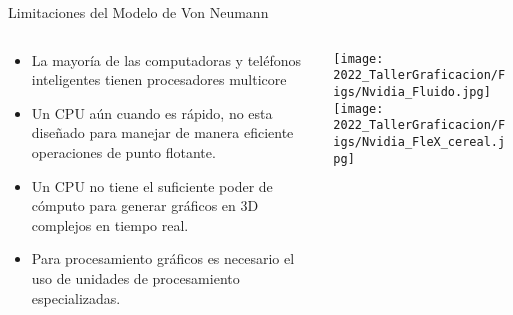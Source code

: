 \begin{frame}{Limitaciones del Modelo de Von Neumann}
\begin{columns}
\begin{column}{0.60\textwidth}  
\begin{itemize}
\item La mayoría de las computadoras y teléfonos inteligentes tienen procesadores multicore
\item Un CPU aún cuando es rápido, no esta diseñado para manejar de manera eficiente operaciones de punto flotante. 
\item Un CPU no tiene el suficiente poder de cómputo para generar gráficos en 3D complejos en tiempo real. 
\item Para procesamiento gráficos es necesario el uso de unidades de procesamiento especializadas.
\end{itemize}
\end{column}
\begin{column}{0.40\textwidth}  
    \begin{center}
     \texttt{[image: 2022\_TallerGraficacion/Figs/Nvidia\_Fluido.jpg]}\\
          \texttt{[image: 2022\_TallerGraficacion/Figs/Nvidia\_FleX\_cereal.jpg]}\\
     \end{center}
\end{column}
\end{columns}
\end{frame}



